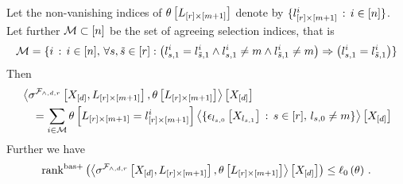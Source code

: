 \begin{theorem}
    Let the non-vanishing indices of $\theta\left[L_{[r]\times[m+1]}\right]$ denote by $\{l_{[r]\times[m+1]}^{i} \,:\, i\in[n]\}$.
    Let further $\mathcal{M}\subset[n]$ be the set of agreeing selection indices, that is
    \begin{align*}
        \mathcal{M} = \{ i \,:\, i\in[n],\,
        \forall{s,\tilde{s}\in[r]} : \big( l_{s,1}^i= l_{\tilde{s},1}^i  \land l_{s,1}^i\neq m \land l_{\tilde{s},1}^i \neq m \big)
        \Rightarrow \big(l_{s,1}^i = l_{\tilde{s},1}^i \big)
        \}
    \end{align*}
    Then
    \begin{align*}
        &\left\langle \sigma^{\mathcal{F}_{\land,d,r}}\left[X_{[d]},L_{[r]\times[m+1]}\right],\theta\left[L_{[r]\times[m+1]}\right]\right\rangle \left[ X_{[d]} \right] \\
        &\quad = \sum_{i\in\mathcal{M}} \theta\left[L_{[r]\times[m+1]}=l_{[r]\times[m+1]}^{i}\right]
        \left\langle \{\epsilon_{l_{s,0}}\left[X_{l_{s,1}}\right] \,:\, s\in[r], \, l_{s,0}\neq m \}\right\rangle \left[ X_{[d]} \right]
    \end{align*}
    Further we have
    \begin{align*}
        \mathrm{rank}^{\mathrm{bas+}}\left(\left\langle \sigma^{\mathcal{F}_{\land,d,r}}\left[X_{[d]},L_{[r]\times[m+1]}\right],\theta\left[L_{[r]\times[m+1]}\right]\right\rangle \left[ X_{[d]} \right]\right)
        \leq \ell_0\left(\theta\right) \, .
    \end{align*}
\end{theorem}
